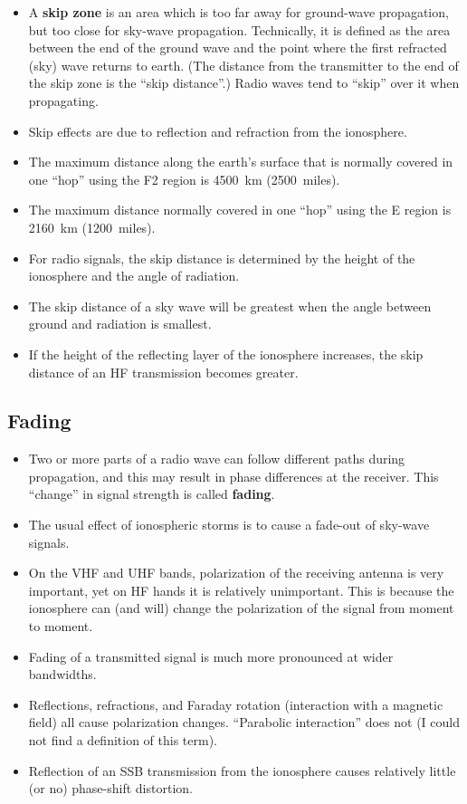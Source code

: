 \documentclass[letterpaper,12pt]{scrartcl}
\begin{document}
\begin{itemize}
\item A \textbf{skip zone} is an area which is too far away for ground-wave propagation, but too close for sky-wave propagation.
  Technically, it is defined as the area between the end of the ground wave and the point where the first refracted (sky) wave returns to earth.
  (The distance from the transmitter to the end of the skip zone is the ``skip distance''.)
  Radio waves tend to ``skip'' over it when propagating.
  \item Skip effects are due to reflection and refraction from the ionosphere.
\item The maximum distance along the earth's surface that is normally covered in one ``hop'' using the F2 region is 4500~km (2500~miles).
\item The maximum distance normally covered in one ``hop'' using the E region is 2160~km (1200~miles).
\item For radio signals, the skip distance is determined by the height of the ionosphere and the angle of radiation.
\item The skip distance of a sky wave will be greatest when the angle between ground and radiation is smallest.
\item If the height of the reflecting layer of the ionosphere increases, the skip distance of an HF transmission becomes greater.
\end{itemize}

\subsection{Fading}

\begin{itemize}
\item Two or more parts of a radio wave can follow different paths during propagation, and this may result in phase differences at the receiver.
  This ``change'' in signal strength is called \textbf{fading}.
\item The usual effect of ionospheric storms is to cause a fade-out of sky-wave signals.
\item On the VHF and UHF bands, polarization of the receiving antenna is very important, yet on HF hands it is relatively unimportant. This is because the
  ionosphere can (and will) change the polarization of the signal from moment to moment.
\item Fading of a transmitted signal is much more pronounced at wider bandwidths.
\item Reflections, refractions, and Faraday rotation (interaction with a magnetic field) all cause polarization changes. ``Parabolic interaction'' does not (I could not find a definition of this term).
  \item Reflection of an SSB transmission from the ionosphere causes relatively little (or no) phase-shift distortion.
\end{itemize}
\end{document}
